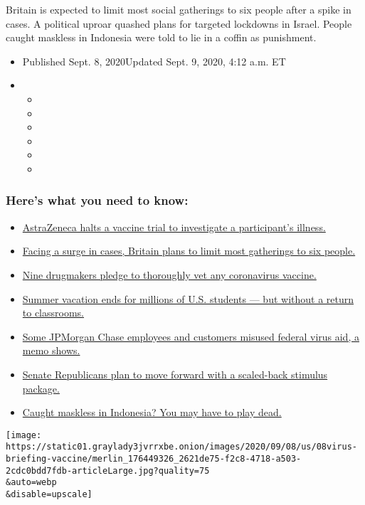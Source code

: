 Britain is expected to limit most social gatherings to six people after
a spike in cases. A political uproar quashed plans for targeted
lockdowns in Israel. People caught maskless in Indonesia were told to
lie in a coffin as punishment.

\begin{itemize}
\item
  Published Sept. 8, 2020Updated Sept. 9, 2020, 4:12 a.m. ET
\item
  \begin{itemize}
  \item
  \item
  \item
  \item
  \item
  \item
  \end{itemize}
\end{itemize}

\hypertarget{heres-what-you-need-to-know}{%
\subsubsection{Here's what you need to
know:}\label{heres-what-you-need-to-know}}

\begin{itemize}
\tightlist
\item
  \protect\hyperlink{link-313b443d}{AstraZeneca halts a vaccine trial to
  investigate a participant's illness.}
\item
  \protect\hyperlink{link-4438dd7}{Facing a surge in cases, Britain
  plans to limit most gatherings to six people.}
\item
  \protect\hyperlink{link-679303d7}{Nine drugmakers pledge to thoroughly
  vet any coronavirus vaccine.}
\item
  \protect\hyperlink{link-7e3d861}{Summer vacation ends for millions of
  U.S. students --- but without a return to classrooms.}
\item
  \protect\hyperlink{link-2b45fbb7}{Some JPMorgan Chase employees and
  customers misused federal virus aid, a memo shows.}
\item
  \protect\hyperlink{link-547feae1}{Senate Republicans plan to move
  forward with a scaled-back stimulus package.}
\item
  \protect\hyperlink{link-184b73e4}{Caught maskless in Indonesia? You
  may have to play dead.}
\end{itemize}

\texttt{[image: https://static01.graylady3jvrrxbe.onion/images/2020/09/08/us/08virus-briefing-vaccine/merlin\_176449326\_2621de75-f2c8-4718-a503-2cdc0bdd7fdb-articleLarge.jpg?quality=75\\\&auto=webp\\\&disable=upscale]}

